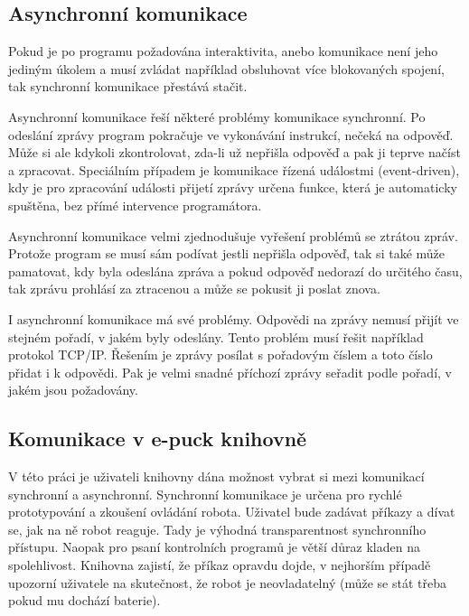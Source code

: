 \documentclass[12pt,notitlepage]{report}
\begin{document}
    \subsection{Asynchronní komunikace}
    \label{async}

    Pokud je po programu požadována interaktivita, anebo komunikace není jeho
    jediným úkolem a musí zvládat například obsluhovat více blokovaných
    spojení, tak synchronní komunikace přestává stačit.

    Asynchronní komunikace řeší některé problémy komunikace synchronní. Po
    odeslání zprávy program pokračuje ve vykonávání instrukcí, nečeká na
    odpověď. Může si ale kdykoli zkontrolovat, zda-li už nepřišla odpověď a pak
    ji teprve načíst a zpracovat. Speciálním případem je komunikace řízená
    událostmi (event-driven), kdy je pro zpracování události přijetí zprávy
    určena funkce, která je automaticky spuštěna, bez přímé intervence
    programátora.

    Asynchronní komunikace velmi zjednodušuje vyřešení problémů se ztrátou
    zpráv. Protože program se musí sám podívat jestli nepřišla odpověď, tak si
    také může pamatovat, kdy byla odeslána zpráva a pokud odpověď nedorazí do
    určitého času, tak zprávu prohlásí za ztracenou a může se pokusit ji poslat
    znova.

    I asynchronní komunikace má své problémy. Odpovědi na zprávy nemusí přijít
    ve stejném pořadí, v jakém byly odeslány. Tento problém musí řešit
    například protokol TCP/IP. Řešením je zprávy posílat s pořadovým číslem a
    toto číslo přidat i k odpovědi. Pak je velmi snadné příchozí zprávy seřadit
    podle pořadí, v jakém jsou požadovány.

    \subsection{Komunikace v e-puck knihovně}
    \label{comm-epuck}

    V této práci je uživateli knihovny dána možnost vybrat si mezi komunikací
    synchronní a asynchronní. Synchronní komunikace je určena pro rychlé
    prototypování a zkoušení ovládání robota. Uživatel bude zadávat příkazy a
    dívat se, jak na ně robot reaguje. Tady je výhodná transparentnost
    synchronního přístupu. Naopak pro psaní kontrolních programů je větší důraz
    kladen na spolehlivost. Knihovna zajistí, že příkaz opravdu dojde, v
    nejhorším případě upozorní uživatele na skutečnost, že robot je
    neovladatelný (může se stát třeba pokud mu dochází baterie).
\end{document}
